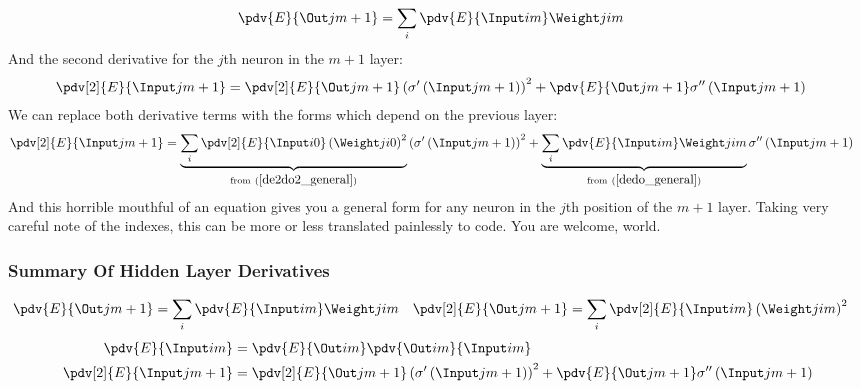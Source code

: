 \begin{align}
\pdv{E}{\Out j {m+1}} &= \sum_i\pdv{E}{\Input i m}\Weight j i m
\end{align}
And the second derivative for the $j$th neuron in the $m+1$ layer:
\begin{align}
\pdv[2]{E}{{\Input j {m+1}}} &= 
\pdv[2]{E}{{\Out j {m+1}}}
\left(\sigma^{\prime}\left({\Input j {m+1}}\right)\right)^2
+
\pdv{E}{{\Out j {m+1}}}\sigma^{\prime\prime}\left(\Input j {m+1}\right)
\end{align}
We can replace both derivative terms with the forms which depend on the previous layer:
\begin{align}
\pdv[2]{E}{{\Input j {m+1}}} &= 
\underbrace{\sum_i\pdv[2]{E}{{\Input i 0}} \left({\Weight j i 0}\right)^2}
_{\text{from} \ (\ref{de2do2_general})}
\left(\sigma^{\prime}\left({\Input j {m+1}}\right)\right)^2
+
\underbrace{\sum_i\pdv{E}{\Input i m}\Weight j i m}
_{\text{from} \ (\ref{dedo_general})}
\sigma^{\prime\prime}\left(\Input j {m+1}\right)
\end{align}
And this horrible mouthful of an equation gives you a general form for any neuron in the $j$th position of the $m+1$ layer. Taking very careful note of the indexes, this can be more or less translated painlessly to code. You are welcome, world.

\subsubsection{Summary Of Hidden Layer Derivatives}
\begin{align}
\pdv{E}{\Out j {m+1}} &= \sum_i\pdv{E}{\Input i m}\Weight j i m &
\pdv[2]{E}{{\Out j {m+1}}} &= 
\sum_i\pdv[2]{E}{{\Input i m}} \left({\Weight j i m}\right)^2
\end{align}
\begin{align}
\pdv{E}{\Input i m} &= 
\pdv{E}{\Out i m}
\pdv{\Out i m}{\Input i m} \\
\pdv[2]{E}{{\Input j {m+1}}} &= 
\pdv[2]{E}{{\Out j {m+1}}}
\left(\sigma^{\prime}\left({\Input j {m+1}}\right)\right)^2
+
\pdv{E}{{\Out j {m+1}}}\sigma^{\prime\prime}\left(\Input j {m+1}\right)
\end{align}